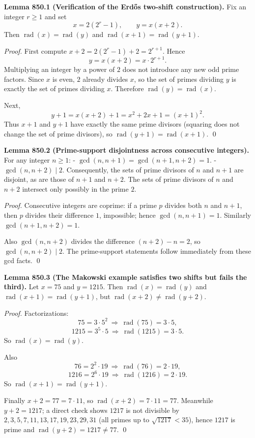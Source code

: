 \textbf{Lemma 850.1 (Verification of the Erd\H{o}s two-shift construction).}
Fix an integer $r\ge 1$ and set
\[
x=2(2^r-1),\qquad y=x(x+2).
\]
Then $\operatorname{rad}(x)=\operatorname{rad}(y)$ and $\operatorname{rad}(x+1)=\operatorname{rad}(y+1)$.

\emph{Proof.}
First compute $x+2=2(2^r-1)+2=2^{r+1}$. Hence
\[
y=x(x+2)=x\cdot 2^{r+1}.
\]
Multiplying an integer by a power of $2$ does not introduce any new odd prime factors. Since $x$ is even, $2$ already divides $x$, so the set of primes dividing $y$ is exactly the set of primes dividing $x$. Therefore $\operatorname{rad}(y)=\operatorname{rad}(x)$.

Next,
\[
y+1=x(x+2)+1 = x^2+2x+1=(x+1)^2.
\]
Thus $x+1$ and $y+1$ have exactly the same prime divisors (squaring does not change the set of prime divisors), so $\operatorname{rad}(y+1)=\operatorname{rad}(x+1)$. \qed

\textbf{Lemma 850.2 (Prime-support disjointness across consecutive integers).}
For any integer $n\ge 1$:
- $\gcd(n,n+1)=\gcd(n+1,n+2)=1$.
- $\gcd(n,n+2)\mid 2$.
Consequently, the sets of prime divisors of $n$ and $n+1$ are disjoint, as are those of $n+1$ and $n+2$. The sets of prime divisors of $n$ and $n+2$ intersect only possibly in the prime $2$.

\emph{Proof.}
Consecutive integers are coprime: if a prime $p$ divides both $n$ and $n+1$, then $p$ divides their difference $1$, impossible; hence $\gcd(n,n+1)=1$. Similarly $\gcd(n+1,n+2)=1$.

Also $\gcd(n,n+2)$ divides the difference $(n+2)-n=2$, so $\gcd(n,n+2)\mid 2$. The prime-support statements follow immediately from these gcd facts. \qed

\textbf{Lemma 850.3 (The Makowski example satisfies two shifts but fails the third).}
Let $x=75$ and $y=1215$. Then $\operatorname{rad}(x)=\operatorname{rad}(y)$ and $\operatorname{rad}(x+1)=\operatorname{rad}(y+1)$, but $\operatorname{rad}(x+2)\ne \operatorname{rad}(y+2)$.

\emph{Proof.}
Factorizations:
\[
75=3\cdot 5^2\ \Rightarrow\ \operatorname{rad}(75)=3\cdot 5,
\]
\[
1215=3^5\cdot 5\ \Rightarrow\ \operatorname{rad}(1215)=3\cdot 5.
\]
So $\operatorname{rad}(x)=\operatorname{rad}(y)$.

Also
\[
76=2^2\cdot 19\ \Rightarrow\ \operatorname{rad}(76)=2\cdot 19,
\]
\[
1216=2^6\cdot 19\ \Rightarrow\ \operatorname{rad}(1216)=2\cdot 19.
\]
So $\operatorname{rad}(x+1)=\operatorname{rad}(y+1)$.

Finally $x+2=77=7\cdot 11$, so $\operatorname{rad}(x+2)=7\cdot 11=77$. Meanwhile $y+2=1217$; a direct check shows $1217$ is not divisible by $2,3,5,7,11,13,17,19,23,29,31$ (all primes up to $\sqrt{1217}<35$), hence $1217$ is prime and $\operatorname{rad}(y+2)=1217\ne 77$. \qed

